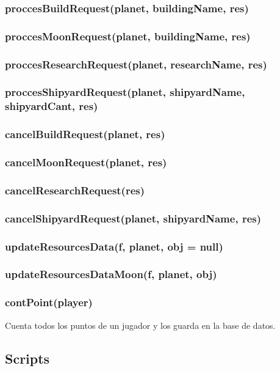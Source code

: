\documentclass{article}
\begin{document}
        \subsubsection{proccesBuildRequest(planet, buildingName, res)}
        \subsubsection{proccesMoonRequest(planet, buildingName, res)}
        \subsubsection{proccesResearchRequest(planet, researchName, res)}
        \subsubsection{proccesShipyardRequest(planet, shipyardName, shipyardCant, res)}
        \subsubsection{cancelBuildRequest(planet, res)}
        \subsubsection{cancelMoonRequest(planet, res)}
        \subsubsection{cancelResearchRequest(res)}
        \subsubsection{cancelShipyardRequest(planet, shipyardName, res)}
        \subsubsection{updateResourcesData(f, planet, obj = null)}
        \subsubsection{updateResourcesDataMoon(f, planet, obj)}
        \subsubsection{contPoint(player)}
          Cuenta todos los puntos de un jugador y los guarda en la base de datos.
    \subsection{Scripts}
\end{document}
